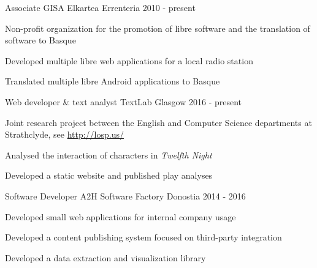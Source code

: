 

\begin{cventries}

  \cventry
    {Associate} %
    {GISA Elkartea} %
    {Errenteria} %
    {2010 - present} %
    {
      \begin{cvitems} %
        \item {Non-profit organization for the promotion of libre software and
            the translation of software to Basque}
        \item {Developed multiple libre web applications for a local radio
            station}
        \item {Translated multiple libre Android applications to Basque}
      \end{cvitems}
    }

  \cventry
    {Web developer \& text analyst} %
    {TextLab} %
    {Glasgow} %
    {2016 - present} %
    {
      \begin{cvitems} %
        \item {Joint research project between the English and Computer Science
            departments at Strathclyde, see \url{http://losp.us/}}
        \item {Analysed the interaction of characters in \textit{Twelfth Night}}
        \item {Developed a static website and published play analyses}
      \end{cvitems}
    }

  \cventry
    {Software Developer} %
    {A2H Software Factory} %
    {Donostia} %
    {2014 - 2016} %
    {
      \begin{cvitems} %
        \item {Developed small web applications for internal company usage}
        \item {Developed a content publishing system focused on third-party
            integration}
        \item {Developed a data extraction and visualization library}
      \end{cvitems}
    }

\end{cventries}
